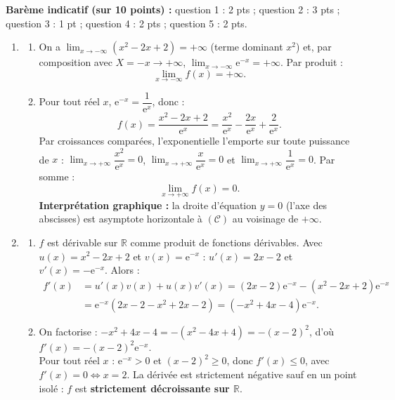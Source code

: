 \documentclass[11pt]{article}
\newcommand{\cle}[1]{{\popxbold\color{popdark}#1}}
\begin{document}
\begin{corrige}
\textbf{Barème indicatif (sur 10 points) :} question 1 : 2 pts ; question 2 : 3 pts ; question 3 : 1 pt ; question 4 : 2 pts ; question 5 : 2 pts.

\begin{enumerate}
\item \begin{enumerate}
\item On a $\displaystyle\lim_{x \to -\infty}\left(x^{2} - 2x + 2\right) = +\infty$ (terme dominant $x^{2}$) et, par composition avec $X = -x \to +\infty$, $\displaystyle\lim_{x \to -\infty} \mathrm{e}^{-x} = +\infty$. Par produit :
\[ \lim_{x \to -\infty} f(x) = +\infty. \]
\item Pour tout réel $x$, $\mathrm{e}^{-x} = \dfrac{1}{\mathrm{e}^{x}}$, donc :
\[ f(x) = \dfrac{x^{2} - 2x + 2}{\mathrm{e}^{x}} = \dfrac{x^{2}}{\mathrm{e}^{x}} - \dfrac{2x}{\mathrm{e}^{x}} + \dfrac{2}{\mathrm{e}^{x}}. \]
Par croissances comparées, l'exponentielle l'emporte sur toute puissance de $x$ : $\displaystyle\lim_{x \to +\infty} \dfrac{x^{2}}{\mathrm{e}^{x}} = 0$, $\displaystyle\lim_{x \to +\infty} \dfrac{x}{\mathrm{e}^{x}} = 0$ et $\displaystyle\lim_{x \to +\infty} \dfrac{1}{\mathrm{e}^{x}} = 0$. Par somme :
\[ \lim_{x \to +\infty} f(x) = 0. \]
\textbf{Interprétation graphique :} la droite d'équation $y = 0$ (l'axe des abscisses) est \cle{asymptote horizontale} à $(\mathcal{C})$ au voisinage de $+\infty$.
\end{enumerate}
\item \begin{enumerate}
\item $f$ est dérivable sur $\mathbb{R}$ comme produit de fonctions dérivables. Avec $u(x) = x^{2}-2x+2$ et $v(x) = \mathrm{e}^{-x}$ : $u'(x) = 2x-2$ et $v'(x) = -\mathrm{e}^{-x}$. Alors :
\begin{align*}
f'(x) &= u'(x)v(x) + u(x)v'(x) = (2x-2)\mathrm{e}^{-x} - \left(x^{2}-2x+2\right)\mathrm{e}^{-x} \\
&= \mathrm{e}^{-x}\left(2x - 2 - x^{2} + 2x - 2\right) = \left(-x^{2} + 4x - 4\right)\mathrm{e}^{-x}.
\end{align*}
\item On factorise : $-x^{2} + 4x - 4 = -\left(x^{2} - 4x + 4\right) = -(x-2)^{2}$, d'où $f'(x) = -(x-2)^{2}\mathrm{e}^{-x}$.\\
Pour tout réel $x$ : $\mathrm{e}^{-x} > 0$ et $(x-2)^{2} \geq 0$, donc $f'(x) \leq 0$, avec $f'(x) = 0 \iff x = 2$. La dérivée est strictement négative sauf en un point isolé : $f$ est \textbf{strictement décroissante sur $\mathbb{R}$}.

\end{enumerate}
\end{enumerate}
\end{corrige}
\end{document}
